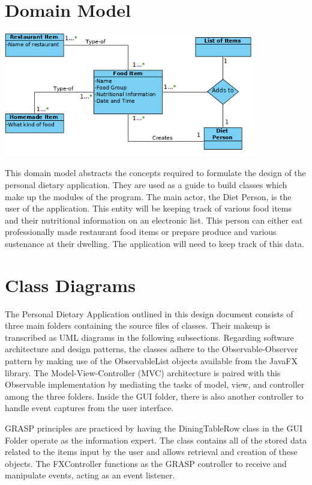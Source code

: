 \documentclass{scrreprt}
\begin{document}
\section{Domain Model}

\includegraphics[width=11cm]{pictures/Domain-Diagram.png}

This domain model abstracts the concepts required to formulate the design of the personal dietary application. They are used as a guide to build classes which make up the modules of the program. The main actor, the Diet Person, is the user of the application. This entity will be keeping track of various food items and their nutritional information on an electronic list. This person can either eat professionally made restaurant food items or prepare produce and various sustenance at their dwelling. The application will need to keep track of this data.

\section{Class Diagrams}

The Personal Dietary Application outlined in this design document consists of three main folders containing the source files of classes. Their makeup is transcribed as UML diagrams in the following subsections. Regarding software architecture and design patterns, the classes adhere to the Observable-Observer pattern by making use of the ObservableList objects available from the JavaFX library. The Model-View-Controller (MVC) architecture is paired with this Observable implementation by mediating the tasks of model, view, and controller among the three folders. Inside the GUI folder, there is also another controller to handle event captures from the user interface. \par
GRASP principles are practiced by having the DiningTableRow class in the GUI Folder operate as the information expert. The class contains all of the stored data related to the items input by the user and allows retrieval and creation of these objects. The FXController functions as the GRASP controller to receive and manipulate events, acting as an event listener.
\end{document}
